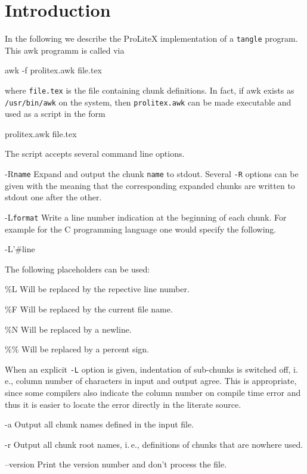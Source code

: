 \documentclass[a4paper]{article} %
\newcommand{\packagename}[1]{{\normalfont\sffamily#1}}
\newcommand\ProLiteX{\textsf{ProLiteX}}
\newcommand{\ie}{i.\,e.}
\newenvironment{ttdescription}
  {\list{}{\labelwidth0pt \itemindent-\leftmargin
      \def\makelabel##1{\hspace\labelsep
        \normalfont\ttfamily ##1:}}}
  {\endlist}
\begin{document}
\section{Introduction}
In the following we describe the \ProLiteX{} implementation of a
\texttt{tangle} program. This \packagename{awk} programm is called via
\begin{myverbatim}
  awk -f prolitex.awk file.tex
\end{myverbatim}
where \texttt{file.tex} is the file containing chunk definitions.
In fact, if \packagename{awk} exists as \texttt{/usr/bin/awk} on the
system, then \texttt{prolitex.awk} can be made executable and used as a
script in the form
\begin{myverbatim}
  prolitex.awk file.tex
\end{myverbatim}
The script accepts several command line options.
\begin{ttdescription}
\item[-R\texttt{name}] Expand and output the chunk \texttt{name} to
  stdout. Several \texttt{-R} options can be given with the meaning
  that the corresponding expanded chunks are written to stdout one
  after the other.

\item[-L\texttt{format}] Write a line number indication at the
  beginning of each chunk. For example for the C programming language
  one would specify the following.
  \begin{myverbatim}
  -L'#line %
  \end{myverbatim}

  The following placeholders can be used:
  \begin{ttdescription}
  \item[\%L]  Will be replaced by the repective line number.
  \item[\%F]  Will be replaced by the current file name.
  \item[\%N]  Will be replaced by a newline.
  \item[\%\%] Will be replaced by a percent sign.
  \end{ttdescription}

  When an explicit \texttt{-L} option is given, indentation of
  sub-chunks is switched off, \ie, column number of characters in
  input and output agree. This is appropriate, since some compilers
  also indicate the column number on compile time error and thus it is
  easier to locate the error directly in the literate source.

\item[-a] Output all chunk names defined in the input file.

\item[-r] Output all chunk root names, \ie, definitions of chunks that
  are nowhere used.

\item[--version] Print the version number and don't process the file.
\end{ttdescription}
\end{document}

